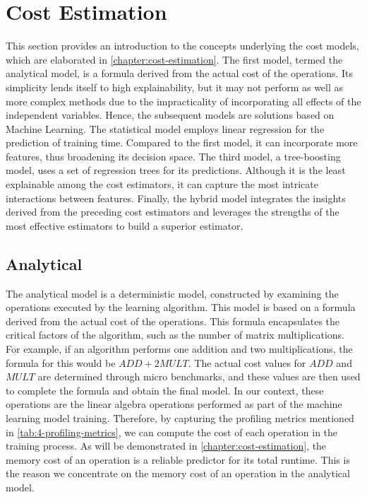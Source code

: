 \section{Cost Estimation}
\label{sec:4-cost-estimation}
This section provides an introduction to the concepts underlying the cost models, which are elaborated in \autoref{chapter:cost-estimation}. The first model, termed the analytical model, is a formula derived from the actual cost of the operations. Its simplicity lends itself to high explainability, but it may not perform as well as more complex methods due to the impracticality of incorporating all effects of the independent variables. Hence, the subsequent models are solutions based on Machine Learning. The statistical model employs linear regression for the prediction of training time. Compared to the first model, it can incorporate more features, thus broadening its decision space. The third model, a tree-boosting model, uses a set of regression trees for its predictions. Although it is the least explainable among the cost estimators, it can capture the most intricate interactions between features. Finally, the hybrid model integrates the insights derived from the preceding cost estimators and leverages the strengths of the most effective estimators to build a superior estimator.

\subsection{Analytical}
The analytical model is a deterministic model, constructed by examining the operations executed by the learning algorithm. This model is based on a formula derived from the actual cost of the operations. This formula encapsulates the critical factors of the algorithm, such as the number of matrix multiplications. For example, if an algorithm performs one addition and two multiplications, the formula for this would be $ADD + 2MULT$. The actual cost values for $ADD$ and $MULT$ are determined through micro benchmarks, and these values are then used to complete the formula and obtain the final model. In our context, these operations are the linear algebra operations performed as part of the machine learning model training. Therefore, by capturing the profiling metrics mentioned in \autoref{tab:4-profiling-metrics}, we can compute the cost of each operation in the training process. As will be demonstrated in \autoref{chapter:cost-estimation}, the memory cost of an operation is a reliable predictor for its total runtime. This is the reason we concentrate on the memory cost of an operation in the analytical model.

